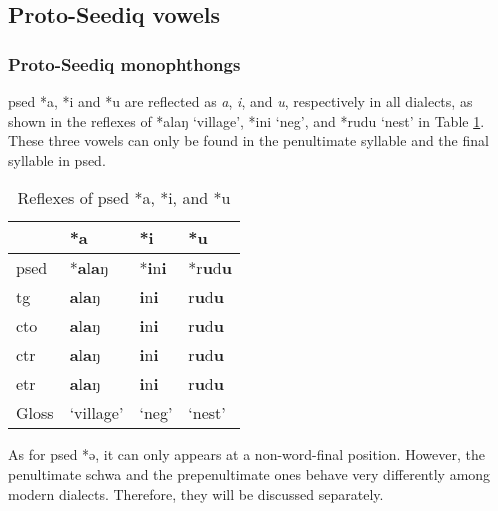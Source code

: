 \subsection{Proto-Seediq vowels} \label{sec:psedV}

\subsubsection{Proto-Seediq monophthongs} \label{sec:psedV_mono}

\acl{psed} *a, *i and *u are reflected as \textit{a}, \textit{i}, and \textit{u}, respectively in all dialects, as shown in the reflexes of *alaŋ `village', *ini `\acs{neg}', and *rudu `nest' in Table \ref{tab:psed_aiu}. These three vowels can only be found in the penultimate syllable and the final syllable in \acl{psed}.  

\begin{table}[!htbp]
\centering
\caption{Reflexes of \acl{psed} *a, *i, and *u}
\label{tab:psed_aiu}
\begin{tabular}{llll}
\hline
           & *a        & *i          & *u     \\ \hline
\acs{psed} & *\textbf{a}l\textbf{a}ŋ     & *\textbf{i}n\textbf{i}        & *r\textbf{u}d\textbf{u}  \\ \hdashline
\acs{tg}   & \textbf{a}l\textbf{a}ŋ      & \textbf{i}n\textbf{i}         & r\textbf{u}d\textbf{u}   \\
\acs{cto}  & \textbf{a}l\textbf{a}ŋ      & \textbf{i}n\textbf{i}         & r\textbf{u}d\textbf{u}   \\
\acs{ctr}  & \textbf{a}l\textbf{a}ŋ      & \textbf{i}n\textbf{i}         & r\textbf{u}d\textbf{u}   \\
\acs{etr}  & \textbf{a}l\textbf{a}ŋ      & \textbf{i}n\textbf{i}         & r\textbf{u}d\textbf{u}   \\ \hline
Gloss      & `village' & `\acs{neg}' & `nest' \\ \hline
\end{tabular}
\end{table}

As for \acl{psed} *ə, it can only appears at a non-word-final position. However, the penultimate schwa and the prepenultimate ones behave very differently among modern dialects. Therefore, they will be discussed separately. 

